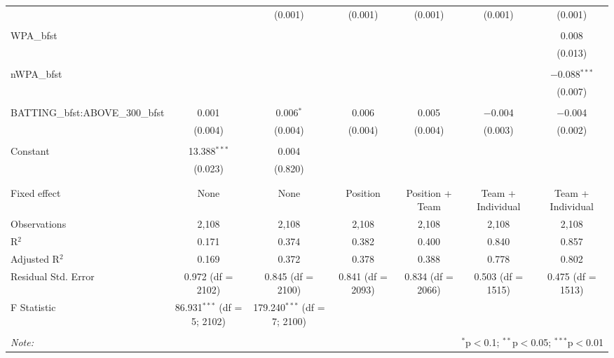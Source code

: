 \begin{table}[!htbp]
\begin{tabular}{@{\extracolsep{5pt}}lcccccc}
  &  & (0.001) & (0.001) & (0.001) & (0.001) & (0.001) \\
  & & & & & & \\
 WPA\_bfst &  &  &  &  &  & 0.008 \\
  &  &  &  &  &  & (0.013) \\
  & & & & & & \\
 nWPA\_bfst &  &  &  &  &  & $-$0.088$^{***}$ \\
  &  &  &  &  &  & (0.007) \\
  & & & & & & \\
 BATTING\_bfst:ABOVE\_300\_bfst & 0.001 & 0.006$^{*}$ & 0.006 & 0.005 & $-$0.004 & $-$0.004 \\
  & (0.004) & (0.004) & (0.004) & (0.004) & (0.003) & (0.002) \\
  & & & & & & \\
 Constant & 13.388$^{***}$ & 0.004 &  &  &  &  \\
  & (0.023) & (0.820) &  &  &  &  \\
  & & & & & & \\
\hline \\[-1.8ex]
Fixed effect & None & None & Position & Position + Team & Team + Individual & Team + Individual \\
Observations & 2,108 & 2,108 & 2,108 & 2,108 & 2,108 & 2,108 \\
R$^{2}$ & 0.171 & 0.374 & 0.382 & 0.400 & 0.840 & 0.857 \\
Adjusted R$^{2}$ & 0.169 & 0.372 & 0.378 & 0.388 & 0.778 & 0.802 \\
Residual Std. Error & 0.972 (df = 2102) & 0.845 (df = 2100) & 0.841 (df = 2093) & 0.834 (df = 2066) & 0.503 (df = 1515) & 0.475 (df = 1513) \\
F Statistic & 86.931$^{***}$ (df = 5; 2102) & 179.240$^{***}$ (df = 7; 2100) &  &  &  &  \\
\hline
\hline \\[-1.8ex]
\textit{Note:}  & \multicolumn{6}{r}{$^{*}$p$<$0.1; $^{**}$p$<$0.05; $^{***}$p$<$0.01} \\
\end{tabular}
\end{table}

